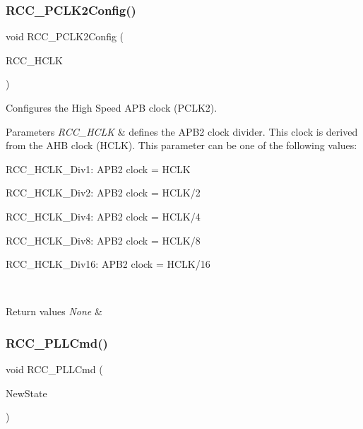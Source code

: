 \subsubsection{\texorpdfstring{RCC\_PCLK2Config()}{RCC\_PCLK2Config()}}
{\footnotesize\ttfamily void R\+C\+C\+\_\+\+P\+C\+L\+K2\+Config (\begin{DoxyParamCaption}\item[{uint32\+\_\+t}]{R\+C\+C\+\_\+\+H\+C\+LK }\end{DoxyParamCaption})}



Configures the High Speed A\+PB clock (P\+C\+L\+K2). 


\begin{DoxyParams}{Parameters}
{\em R\+C\+C\+\_\+\+H\+C\+LK} & defines the A\+P\+B2 clock divider. This clock is derived from the A\+HB clock (H\+C\+LK). This parameter can be one of the following values\+: \begin{DoxyItemize}
\item R\+C\+C\+\_\+\+H\+C\+L\+K\+\_\+\+Div1\+: A\+P\+B2 clock = H\+C\+LK \item R\+C\+C\+\_\+\+H\+C\+L\+K\+\_\+\+Div2\+: A\+P\+B2 clock = H\+C\+L\+K/2 \item R\+C\+C\+\_\+\+H\+C\+L\+K\+\_\+\+Div4\+: A\+P\+B2 clock = H\+C\+L\+K/4 \item R\+C\+C\+\_\+\+H\+C\+L\+K\+\_\+\+Div8\+: A\+P\+B2 clock = H\+C\+L\+K/8 \item R\+C\+C\+\_\+\+H\+C\+L\+K\+\_\+\+Div16\+: A\+P\+B2 clock = H\+C\+L\+K/16 \end{DoxyItemize}
\\
\hline
\end{DoxyParams}

\begin{DoxyRetVals}{Return values}
{\em None} & \\
\hline
\end{DoxyRetVals}
\mbox{\label{group___r_c_c___private___functions_ga84dee53c75e58fdb53571716593c2272}} 
\subsubsection{\texorpdfstring{RCC\_PLLCmd()}{RCC\_PLLCmd()}}
{\footnotesize\ttfamily void R\+C\+C\+\_\+\+P\+L\+L\+Cmd (\begin{DoxyParamCaption}\item[{\mbox{\hyperlink{group___exported__types_gac9a7e9a35d2513ec15c3b537aaa4fba1}{Functional\+State}}}]{New\+State }\end{DoxyParamCaption})}



